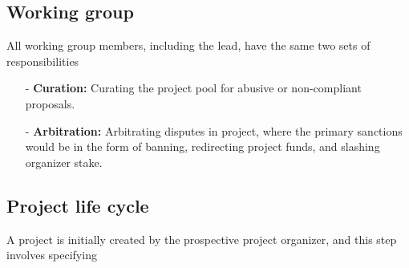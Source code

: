 \documentclass{article}
\begin{document}
\subsection{Working group}

All working group members, including the lead, have the same two sets of responsibilities

\begin{itemize}
 \item[-] \textbf{Curation:} Curating the project pool for abusive or non-compliant proposals.
 \item[-] \textbf{Arbitration:} Arbitrating disputes in project, where the primary sanctions would be in the form of banning, redirecting project funds, and slashing organizer stake.
\end{itemize}

\subsection{Project life cycle}

A project is initially created by the prospective project organizer, and this step involves specifying
\end{document}
